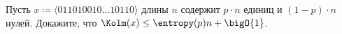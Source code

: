 Пусть $x \coloneqq \langle{011010010 \dotso 10110}\rangle$ длины $n$ содержит $p \cdot n$ единиц и $(1 - p) \cdot
n$ нулей. Докажите, что $\Kolm(x) \le \entropy(p) n + \bigO{1}$.